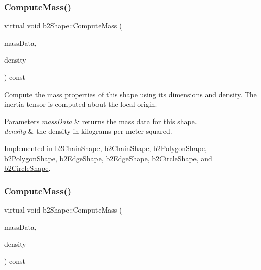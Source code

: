 \subsubsection{\texorpdfstring{Compute\+Mass()}{ComputeMass()}\hspace{0.1cm}{\footnotesize\ttfamily [1/2]}}
{\footnotesize\ttfamily virtual void b2\+Shape\+::\+Compute\+Mass (\begin{DoxyParamCaption}\item[{\hyperlink{structb2MassData}{b2\+Mass\+Data} $\ast$}]{mass\+Data,  }\item[{float32}]{density }\end{DoxyParamCaption}) const\hspace{0.3cm}{\ttfamily [pure virtual]}}

Compute the mass properties of this shape using its dimensions and density. The inertia tensor is computed about the local origin. 
\begin{DoxyParams}{Parameters}
{\em mass\+Data} & returns the mass data for this shape. \\
\hline
{\em density} & the density in kilograms per meter squared. \\
\hline
\end{DoxyParams}


Implemented in \hyperlink{classb2ChainShape_aad3671d6eab61f6b26e2f1b6ac50bb98}{b2\+Chain\+Shape}, \hyperlink{classb2ChainShape_a55efeb6d4005c1ca4b01cbcc5d7369db}{b2\+Chain\+Shape}, \hyperlink{classb2PolygonShape_a33e75858a1b9e26fdf7f723825cda878}{b2\+Polygon\+Shape}, \hyperlink{classb2PolygonShape_a908db2a51fc79fd49d6fe06be2cd8474}{b2\+Polygon\+Shape}, \hyperlink{classb2EdgeShape_a1cd695882766566f76bb0fedf346407d}{b2\+Edge\+Shape}, \hyperlink{classb2EdgeShape_ac738c1e0ab2f4dfbab26e3942efa60af}{b2\+Edge\+Shape}, \hyperlink{classb2CircleShape_a5f2e516df3f347a51017bca2bd0e5aab}{b2\+Circle\+Shape}, and \hyperlink{classb2CircleShape_a7dc07891abd015863fbf03076e47eec5}{b2\+Circle\+Shape}.

\mbox{\label{classb2Shape_a61b365526241b47f124789b0309cac69}} 
\subsubsection{\texorpdfstring{Compute\+Mass()}{ComputeMass()}\hspace{0.1cm}{\footnotesize\ttfamily [2/2]}}
{\footnotesize\ttfamily virtual void b2\+Shape\+::\+Compute\+Mass (\begin{DoxyParamCaption}\item[{\hyperlink{structb2MassData}{b2\+Mass\+Data} $\ast$}]{mass\+Data,  }\item[{float32}]{density }\end{DoxyParamCaption}) const\hspace{0.3cm}{\ttfamily [pure virtual]}}

